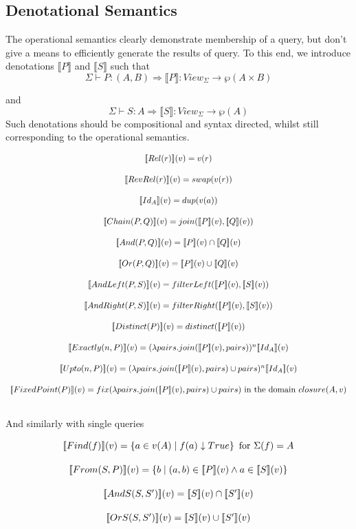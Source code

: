 \documentclass[twoside,a4paper,11pt]{article}
\newcommand{\db}[1]{{\bf [\![}#1{\bf ]\!]}}
\newcommand{\deno}[1]{\db{#1}(v)}
\newcommand{\setComp}[2]{\left\lbrace #1 \mid #2 \right\rbrace}
\newcommand{\clos}[0]{closure(A, v)}
\begin{document}
\subsection{Denotational Semantics}

The operational semantics clearly demonstrate membership of a query, but don't give a means to efficiently generate the results of query. To this end, we introduce denotations $\llbracket P \rrbracket$ and $\llbracket S \rrbracket$ such that $$\Sigma \vdash P \colon (A, B) \Rightarrow\llbracket P \rrbracket \colon View_{\Sigma} \rightarrow \wp(A \times B)$$

and $$\Sigma \vdash S \colon A \Rightarrow\llbracket S \rrbracket \colon View_{\Sigma} \rightarrow \wp(A)$$ Such denotations should be compositional and syntax directed, whilst still corresponding to the operational semantics.

\[ \begin{array}{c}
 \deno{Rel(r)} = v(r) \\[3ex]
 \deno{RevRel(r)} = swap(v(r)) \\[3ex]
 \deno{Id_A} = dup(v(a)) \\[3ex]
 \deno{Chain(P, Q)} = join(\deno{P}, \deno{Q}) \\[3ex]
 \deno{And(P, Q)} = \deno{P} \cap \deno{Q} \\[3ex]
 \deno{Or(P, Q)} = \deno{P} \cup \deno{Q} \\[3ex]
 \deno{AndLeft(P, S)} = filterLeft(\deno{P}, \deno{S}) \\[3ex]
 \deno{AndRight(P, S)} = filterRight(\deno{P}, \deno{S}) \\[3ex]
 \deno{Distinct(P)} = distinct(\deno{P}) \\[3ex]
 
 \deno{Exactly(n, P)} = (\lambda pairs. join(\deno{P}, pairs))^n \deno{Id_A} \\[3ex]
 \deno{Upto(n, P)} = (\lambda pairs. join(\deno{P}, pairs) \cup pairs)^n \deno{Id_A} \\[3ex]
 \deno{FixedPoint(P)} = fix (\lambda pairs. join(\deno{P}, pairs) \cup pairs)  \mbox{ in the domain $\clos$}\\[3ex]
\end{array} \]

And similarly with single queries

\[ \begin{array}{c}
\deno{Find(f)} = \setComp{a \in v(A)}{f(a)\downarrow True} \mbox{ for $\Sigma(f) = A$} \\[3ex]

\deno{From(S, P)} =  \setComp{b}{(a, b) \in \deno{P} \wedge a \in \deno{S}}   \\[3ex]

\deno{AndS(S, S')} = \deno{S} \cap \deno{S'} \\[3ex]

\deno{OrS(S, S')} = \deno{S} \cup \deno{S'} \\[3ex]

\end{array}\]
\end{document}
